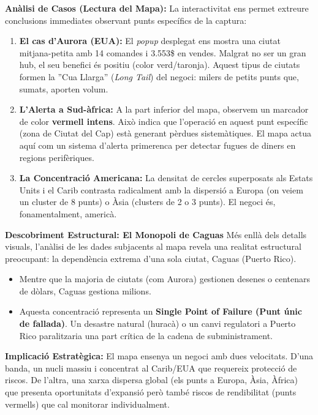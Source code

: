 \documentclass[12pt,a4paper]{article}
\begin{document}
\textbf{Anàlisi de Casos (Lectura del Mapa):}
La interactivitat ens permet extreure conclusions immediates observant punts específics de la captura:
\begin{enumerate}
    \item \textbf{El cas d'Aurora (EUA):} El \textit{popup} desplegat ens mostra una ciutat mitjana-petita amb 14 comandes i 3.553\$ en vendes. Malgrat no ser un gran hub, el seu benefici és positiu (color verd/taronja). Aquest tipus de ciutats formen la ''Cua Llarga'' (\textit{Long Tail}) del negoci: milers de petits punts que, sumats, aporten volum.
    
    \item \textbf{L'Alerta a Sud-àfrica:} A la part inferior del mapa, observem un marcador de color \textbf{vermell intens}. Això indica que l'operació en aquest punt específic (zona de Ciutat del Cap) està generant pèrdues sistemàtiques. El mapa actua aquí com un sistema d'alerta primerenca per detectar fugues de diners en regions perifèriques.
    
    \item \textbf{La Concentració Americana:} La densitat de cercles superposats als Estats Units i el Carib contrasta radicalment amb la dispersió a Europa (on veiem un cluster de 8 punts) o Àsia (clusters de 2 o 3 punts). El negoci és, fonamentalment, americà.
\end{enumerate}

\textbf{Descobriment Estructural: El Monopoli de Caguas}
Més enllà dels detalls visuals, l'anàlisi de les dades subjacents al mapa revela una realitat estructural preocupant: la dependència extrema d'una sola ciutat, Caguas (Puerto Rico).
\begin{itemize}
    \item Mentre que la majoria de ciutats (com Aurora) gestionen desenes o centenars de dòlars, Caguas gestiona milions.
    \item Aquesta concentració representa un \textbf{Single Point of Failure (Punt únic de fallada)}. Un desastre natural (huracà) o un canvi regulatori a Puerto Rico paralitzaria una part crítica de la cadena de subministrament.
\end{itemize}

\textbf{Implicació Estratègica:}
El mapa ensenya un negoci amb dues velocitats. D'una banda, un nucli massiu i concentrat al Carib/EUA que requereix protecció de riscos. De l'altra, una xarxa dispersa global (els punts a Europa, Àsia, Àfrica) que presenta oportunitats d'expansió però també riscos de rendibilitat (punts vermells) que cal monitorar individualment.
\end{document}
